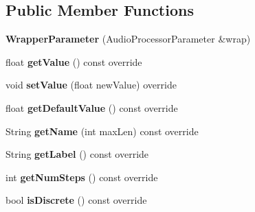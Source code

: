 \subsection*{Public Member Functions}
\begin{DoxyCompactItemize}
\item 
\mbox{\label{class_wrapper_processor_1_1_wrapper_parameter_a9968d2e8fd56a463cc49df987d156e38}} 
{\bfseries Wrapper\+Parameter} (Audio\+Processor\+Parameter \&wrap)
\item 
\mbox{\label{class_wrapper_processor_1_1_wrapper_parameter_a7e9956ad12fa225fc67f10dda1008a4c}} 
float {\bfseries get\+Value} () const override
\item 
\mbox{\label{class_wrapper_processor_1_1_wrapper_parameter_aaaa12f2fb944db7a7f178b8be216c09e}} 
void {\bfseries set\+Value} (float new\+Value) override
\item 
\mbox{\label{class_wrapper_processor_1_1_wrapper_parameter_a1546c97e32b890bfee4fb57b2421d24f}} 
float {\bfseries get\+Default\+Value} () const override
\item 
\mbox{\label{class_wrapper_processor_1_1_wrapper_parameter_a95d71b49fcd66cdee771159a93eb4234}} 
String {\bfseries get\+Name} (int max\+Len) const override
\item 
\mbox{\label{class_wrapper_processor_1_1_wrapper_parameter_a84711eccda8e95907c1e2dcd24ba233e}} 
String {\bfseries get\+Label} () const override
\item 
\mbox{\label{class_wrapper_processor_1_1_wrapper_parameter_a3bcf34af00ed0db87c962cccba6b8b0c}} 
int {\bfseries get\+Num\+Steps} () const override
\item 
\mbox{\label{class_wrapper_processor_1_1_wrapper_parameter_a137c2cef47bb5aea4da98695f3cded76}} 
bool {\bfseries is\+Discrete} () const override
\item 

\end{DoxyCompactItemize}

